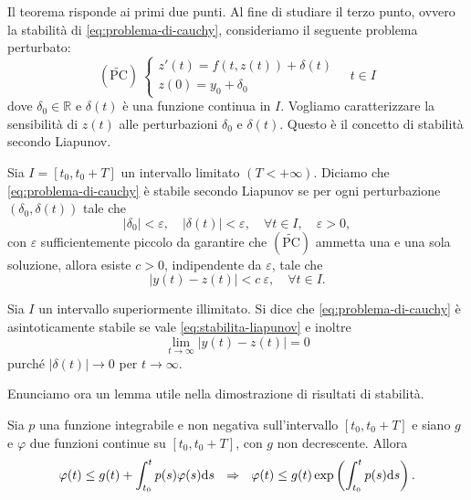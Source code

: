 Il teorema risponde ai primi due punti. Al fine di studiare il terzo punto, ovvero la stabilità di \eqref{eq:problema-di-cauchy}, consideriamo il seguente problema perturbato:
\begin{equation*}
(\widetilde{\text{PC}}) \ \begin{cases}
z'(t) =f( t,z(t)) +\delta (t)\\
z(0) =y_{0} +\delta _{0}
\end{cases} \quad t\in I
\end{equation*}
dove $\delta _{0} \in \mathbb{R}$ e $\delta (t)$ è una funzione continua in $I$. Vogliamo caratterizzare la sensibilità di $z(t)$ alle perturbazioni $\delta _{0}$ e $\delta (t)$. Questo è il concetto di stabilità secondo Liapunov.

\begin{definition}
Sia $I=[ t_{0} ,t_{0} +T]$ un intervallo limitato $( T< +\infty )$.
Diciamo che \eqref{eq:problema-di-cauchy} è stabile secondo Liapunov se per ogni perturbazione $( \delta _{0} ,\delta (t))$ tale che
\begin{equation*}
| \delta _{0}| < \varepsilon ,\quad | \delta (t)| < \varepsilon ,\quad \forall t\in I,\quad \varepsilon  >0,
\end{equation*}
con $\varepsilon $ sufficientemente piccolo da garantire che $(\widetilde{\text{PC}})$ ammetta una e una sola soluzione, allora esiste $c >0$, indipendente da $\varepsilon $, tale che
\begin{equation}
| y(t) -z(t)| < c\ \varepsilon ,\quad \forall t\in I.
\label{eq:stabilita-liapunov}
\end{equation}
\end{definition}

\begin{definition}
Sia $I$ un intervallo superiormente illimitato.
Si dice che \eqref{eq:problema-di-cauchy} è asintoticamente stabile se vale \eqref{eq:stabilita-liapunov} e inoltre
\begin{equation*}
\lim _{t\rightarrow \infty }| y(t) -z(t)| =0
\end{equation*}
purché $| \delta (t)| \rightarrow 0$ per $t\rightarrow \infty $.
\end{definition}

Enunciamo ora un lemma utile nella dimostrazione di risultati di stabilità.
\begin{lemma}
[Gronwall]
Sia $p$ una funzione integrabile e non negativa sull'intervallo $[ t_{0} ,t_{0} +T]$ e siano $g$ e $\varphi $ due funzioni continue su $[ t_{0} ,t_{0} +T]$, con $g$ non decrescente. Allora
\begin{equation*}
\varphi (t) \leqslant g(t) +\int\nolimits ^{t}_{t_{0}} p(s) \varphi (s) \ds \ \ \Rightarrow \ \ \varphi (t) \leqslant g(t)\exp\left(\int\nolimits ^{t}_{t_{0}} p(s) \ds\right).
\end{equation*}
\end{lemma}

